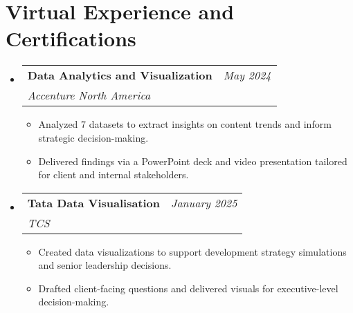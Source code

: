 \documentclass[a4paper,11pt]{article}
\makeatletter
\newcommand{\resumeSubheading}[4]{
\vspace{0.5mm}\item
    \begin{tabular*}{0.98\textwidth}[t]{l@{\extracolsep{\fill}}r}
        \textbf{#1} & \textit{\footnotesize{#4}} \\
        \textit{\footnotesize{#3}} &  \footnotesize{#2}\\
    \end{tabular*}
    \vspace{-2.4mm}
}
\newcommand{\resumeSubHeadingListStart}{\begin{itemize}[leftmargin=*,labelsep=1mm]}
\newcommand{\resumeItemListStart}{\begin{itemize}[leftmargin=*,labelsep=1mm,itemsep=0.5mm]}
\newcommand{\resumeSubHeadingListEnd}{\end{itemize}\vspace{2mm}}
\newcommand{\resumeItemListEnd}{\end{itemize}\vspace{-2mm}}
\makeatother
\begin{document}
\section{\textbf{Virtual Experience and Certifications}}
\vspace{-0.4mm}
  \resumeSubHeadingListStart
  \resumeSubheading
      {Data Analytics and Visualization }{}
      {Accenture North America }{May 2024 }
      \resumeItemListStart
        \item Analyzed 7 datasets to extract insights on content trends and inform strategic decision-making.
        \item Delivered findings via a PowerPoint deck and video presentation tailored for client and internal stakeholders. 
        
        
      \resumeItemListEnd 
  \resumeSubheading
    {Tata Data Visualisation }{}
    {TCS }{January 2025}
    \resumeItemListStart
      \item Created data visualizations to support development strategy simulations and senior leadership decisions.
      \item Drafted client-facing questions and delivered visuals for executive-level decision-making.
      
      
    \resumeItemListEnd
  \resumeSubHeadingListEnd

 


\vspace{-5mm}
\end{document}
